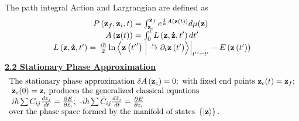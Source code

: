 \documentclass{amsart}
\begin{document}
The path integral Action and Largrangian are defined as
\[
\begin{array}{c}
 P\left( {{\rm {\bf z}}_f ,{\rm {\bf z}}_i ,t} \right)=\int_{{\rm {\bf z}}_i
}^{{\rm {\bf z}}_f } {e^{\frac{i}{\hbar }A\left( {{\rm {\bf z}}(t)}
\right)}d\mu ({\rm {\bf z}})} \mbox{ } \\
 A\left( {{\rm {\bf z}}(t)} \right)=\int_0^t {L\left( {{\rm {\bf z}},{\rm
{\bf \dot {z}}},{t}'} \right)d{t}'} \\
 L\left( {{\rm {\bf z}},{\rm {\bf \dot {z}}},{t}'} \right)=\left.
{\frac{i\hbar }{2}\ln \left\langle {{\rm {\bf z}}\left( {{{t}'}'} \right)}
\mathrel{\left| {\vphantom {{{\rm {\bf z}}\left( {{{t}'}'} \right)}
{\overset{\lower0.5em\hbox{$\smash{\scriptscriptstyle\leftrightarrow}$}}\to
{{\partial }} _t {\rm {\bf z}}\left( {{t}'} \right)}}} \right.
\kern-\nulldelimiterspace}
{\overset{\lower0.5em\hbox{$\smash{\scriptscriptstyle\leftrightarrow}$}}\to
{{\partial }} _t {\rm {\bf z}}\left( {{t}'} \right)} \right\rangle }
\right|_{{{t}'}'={t}'} -E\left( {{\rm {\bf z}}\left( {{t}'} \right)} \right)
\\
 \end{array}
\]
\underline {\textbf{2.2 Stationary Phase Approximation}}
\[
\begin{array}{l}
 \mbox{The stationary phase approximation }\delta A\left( {{\rm {\bf z}}_c }
\right)=0;\mbox{ with fixed end points }{\rm {\bf z}}_c (t)={\rm {\bf z}}_f
; \\
 \mbox{ }{\rm {\bf z}}_c (0)={\rm {\bf z}}_i \mbox{ produces the generalized
classical equations } \\
 \mbox{ }i\hbar \sum {C_{ij} \frac{dz_j }{dt}} =\frac{\partial E}{\partial
\bar {z}_i };\mbox{ -}i\hbar \sum {\bar {C}_{ij} \frac{d\bar {z}_j }{dt}}
=\frac{\partial E}{\partial z_i } \\
 \mbox{over the phase space formed by the manifold of states }\left\{
{\left| {\rm {\bf z}} \right\rangle } \right\}\mbox{. } \\
 \end{array}
\]
\end{document}
